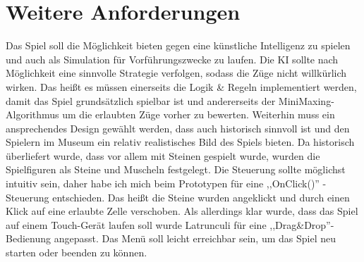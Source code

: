 \section{Weitere Anforderungen}
\label{ch:Analyse:sec:Anforderungen}
Das Spiel soll die Möglichkeit bieten gegen eine künstliche Intelligenz zu spielen und auch als Simulation für Vorführungszwecke zu laufen. Die KI sollte nach Möglichkeit eine sinnvolle Strategie verfolgen, sodass die Züge nicht willkürlich wirken. Das heißt es müssen einerseits die Logik \& Regeln implementiert werden, damit das Spiel grundsätzlich spielbar ist und andererseits der MiniMaxing-Algorithmus um die erlaubten Züge vorher zu bewerten. Weiterhin muss ein ansprechendes Design gewählt werden, dass auch historisch sinnvoll ist und den Spielern im Museum ein relativ realistisches Bild des Spiels bieten. Da historisch überliefert wurde, dass vor allem mit Steinen gespielt wurde, wurden die Spielfiguren als Steine und Muscheln festgelegt. Die Steuerung sollte möglichst intuitiv sein, daher habe ich mich beim Prototypen für eine ,,OnClick()'' -Steuerung entschieden. Das heißt die Steine wurden angeklickt und durch einen Klick auf eine erlaubte Zelle verschoben. Als allerdings klar wurde, dass das Spiel auf einem Touch-Gerät laufen soll wurde Latrunculi für eine ,,Drag\&Drop''-Bedienung angepasst. Das Menü soll leicht erreichbar sein, um das Spiel neu starten oder beenden zu können.






